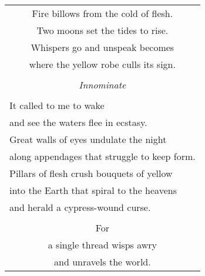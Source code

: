 \documentclass{article}
\begin{document}
\begin{center}
\begin{tabular}{l}
\multicolumn{1}{c}{Fire billows from the cold of flesh.} \\
\multicolumn{1}{c}{Two moons set the tides to rise.} \\
\multicolumn{1}{c}{Whispers go and unspeak becomes} \\
\multicolumn{1}{c}{where the yellow robe culls its sign.} \\
\\
\multicolumn{1}{c}{\textit{Innominate}} \\ %
\\
It called to me to wake \\
and see the waters flee in ecstasy. \\
Great walls of eyes undulate the night \\
along appendages that struggle to keep form. \\
Pillars of flesh crush bouquets of yellow \\
into the Earth that spiral to the heavens \\
and herald a cypress-wound curse. \\
\\
\multicolumn{1}{c}{For} \\
\multicolumn{1}{c}{a single thread wisps awry} \\
\multicolumn{1}{c}{and unravels the world.} \\
\end{tabular}
\end{center}
\end{document}

